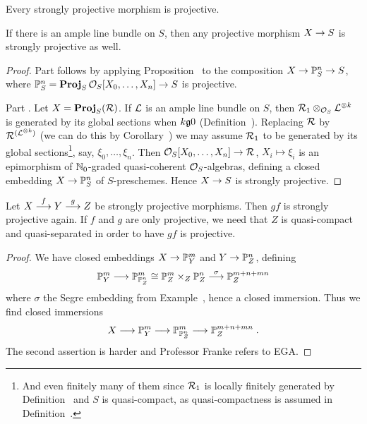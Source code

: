\documentclass[a4paper,parskip=half,numbers=enddot, DIV=12]{scrreprt}
\begin{document}
\begin{cor}
	\begin{alphanumerate}
		\item {}Every strongly projective morphism is projective.
		\item If there is an ample line bundle on $S$, then any projective morphism $X\morphism S$ is strongly projective as well.
	\end{alphanumerate}
\end{cor}
\begin{proof}
	Part  follows by applying Proposition~ to the composition $X\morphism\IP_S^n\morphism S$, where $\IP_S^n=\PROJ_S\Oo_S[X_0,\ldots,X_n]\morphism S$ is projective.
	
	Part . Let $X=\operatorname{\mathbf{Proj}}_S(\mathcal{R})$. If $\mathcal{L}$ is an ample line bundle on $S$, then $\mathcal{R}_1\otimes_{\mathcal{O}_S}\mathcal{L}^{\otimes k}$ is generated by its global sections when $k\gge 0$ (Definition~). Replacing $\mathcal{R}$ by $\mathcal{R}^{(\mathcal{L}^{\otimes k})}$ (we can do this by Corollary~) we may assume $\mathcal{R}_1$ to be generated by its global sections\footnote{And even finitely many of them since $\mathcal{R}_1$ is locally finitely generated by Definition~ and $S$ is quasi-compact, as quasi-compactness is assumed in Definition~.}, say, $\xi_0,\ldots,\xi_n$. Then $\Oo_S[X_0,\ldots,X_n]\morphism\Rr$, $X_i\mapsto \xi_i$ is an epimorphism of $\mathbb{N}_0$-graded quasi-coherent $\mathcal{O}_S$-algebras, defining a closed embedding $X\morphism\IP_S^n$ of $S$-preschemes. Hence $X\morphism S$ is strongly projective.
\end{proof}
\begin{prop}
	Let $X\morphism[f]Y\morphism[g]Z$ be strongly projective morphisms. Then $gf$ is strongly projective again. If $f$ and $g$ are only projective, we need that $Z$ is quasi-compact and quasi-separated in order to have $gf$ is projective.
\end{prop}
\begin{proof}
	We have closed embeddings $X\morphism\IP_Y^m$ and $Y\morphism\IP_Z^n$, defining
	\begin{align*}
		\IP_Y^m\morphism\IP_{\IP_Z^n}^m\cong \IP_Z^m\times_Z\IP_Z^n\morphism[\sigma]\IP_Z^{m+n+mn}
	\end{align*}
	where $\sigma$ the Segre embedding from Example~, hence a closed immersion. Thus we find closed immersions 
	\begin{align*}
		X\morphism \IP_Y^m\morphism\IP_{\IP_Z^n}^m\morphism\IP_Z^{m+n+mn}\;.
	\end{align*}	
	The second assertion is harder and Professor Franke refers to EGA.
\end{proof}
\end{document}
